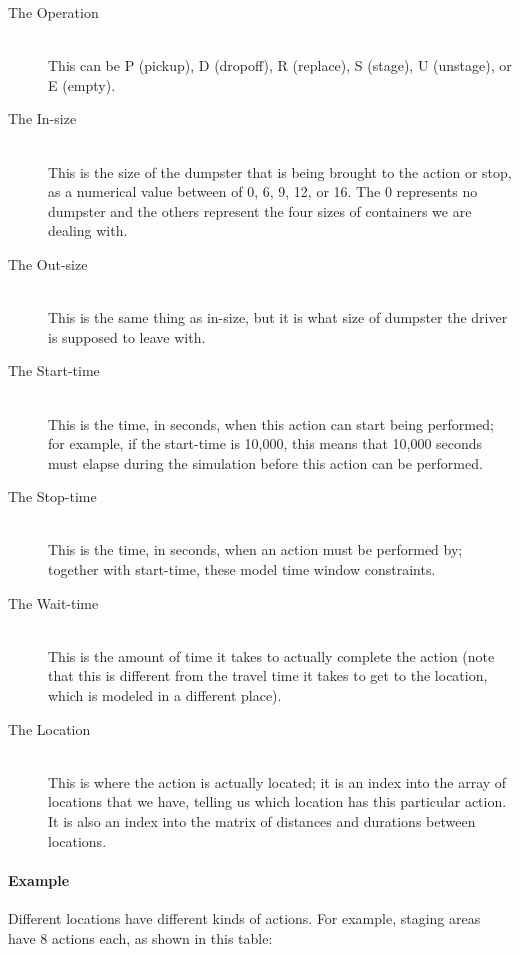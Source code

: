 \documentclass{article}
\begin{document}
\begin{description}
\item[The Operation ] \hfill \\
 This can be P (pickup), D (dropoff), R (replace), S (stage), U (unstage), or E (empty).
\item[The In-size   ] \hfill \\
 This is the size of the dumpster that is being brought to the action or stop, as a numerical value between of 0, 6, 9, 12, or 16.
The 0 represents no dumpster and the others represent the four sizes of containers we are dealing with.
\item[The Out-size  ] \hfill \\
 This is the same thing as in-size, but it is what size of dumpster the driver is supposed to leave with.
\item[The Start-time] \hfill \\
 This is the time, in seconds, when this action can start being performed; for example, if the start-time is 10,000, this means that 10,000 seconds must elapse during the simulation before this action can be performed.
\item[The Stop-time ] \hfill \\
 This is the time, in seconds, when an action must be performed by; together with start-time, these model time window constraints.
\item[The Wait-time ] \hfill \\
This is the amount of time it takes to actually complete the action (note that this is different from the travel time it takes to get to the location, which is modeled in a different place).
\item[The Location  ] \hfill \\
This is where the action is actually located; it is an index into the array of locations that we have, telling us which location has this particular action.
It is also an index into the matrix of distances and durations between locations.
\end{description}


\paragraph{Example}

Different locations have different kinds of actions.
For example, staging areas have 8 actions each, as shown in this table:
\end{document}
